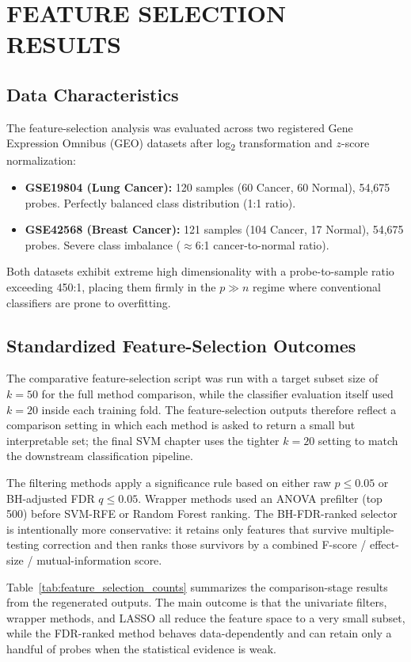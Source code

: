 \chapter{FEATURE SELECTION RESULTS}

\section{Data Characteristics}

The feature-selection analysis was evaluated across two registered Gene Expression Omnibus (GEO) datasets after log\textsubscript{2} transformation and $z$-score normalization:
\begin{itemize}
    \item \textbf{GSE19804 (Lung Cancer):} 120 samples (60 Cancer, 60 Normal), 54,675 probes. Perfectly balanced class distribution (1:1 ratio).
    \item \textbf{GSE42568 (Breast Cancer):} 121 samples (104 Cancer, 17 Normal), 54,675 probes. Severe class imbalance ($\approx$6:1 cancer-to-normal ratio).
\end{itemize}
Both datasets exhibit extreme high dimensionality with a probe-to-sample ratio exceeding 450:1, placing them firmly in the $p \gg n$ regime where conventional classifiers are prone to overfitting.

\section{Standardized Feature-Selection Outcomes}

The comparative feature-selection script was run with a target subset size of $k = 50$ for the full method comparison, while the classifier evaluation itself used $k = 20$ inside each training fold. The feature-selection outputs therefore reflect a comparison setting in which each method is asked to return a small but interpretable set; the final SVM chapter uses the tighter $k=20$ setting to match the downstream classification pipeline.

The filtering methods apply a significance rule based on either raw $p \leq 0.05$ or BH-adjusted FDR $q \leq 0.05$. Wrapper methods used an ANOVA prefilter (top 500) before SVM-RFE or Random Forest ranking. The BH-FDR-ranked selector is intentionally more conservative: it retains only features that survive multiple-testing correction and then ranks those survivors by a combined F-score / effect-size / mutual-information score.

Table~\ref{tab:feature_selection_counts} summarizes the comparison-stage results from the regenerated outputs. The main outcome is that the univariate filters, wrapper methods, and LASSO all reduce the feature space to a very small subset, while the FDR-ranked method behaves data-dependently and can retain only a handful of probes when the statistical evidence is weak.


